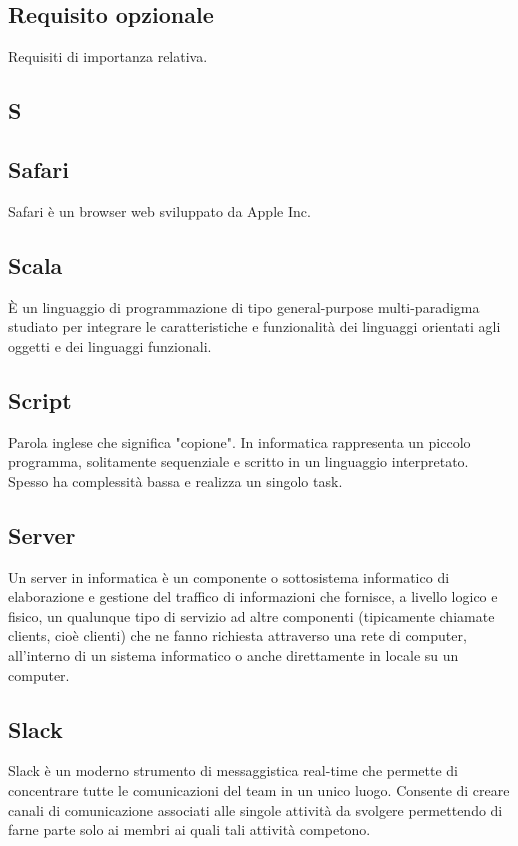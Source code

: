\subsection*{Requisito opzionale}
Requisiti di importanza relativa.

\newpage

\begin{center}
\Huge\section*{\uppercase{S}}
\end{center}

\subsection*{Safari}
Safari è un browser web sviluppato da Apple Inc. 

\subsection*{Scala}
È un linguaggio di programmazione di tipo general-purpose multi-paradigma studiato per integrare le caratteristiche e funzionalità dei linguaggi orientati agli oggetti e dei linguaggi funzionali.

\subsection*{Script}
Parola inglese che significa "copione". In informatica rappresenta un piccolo
programma, solitamente sequenziale e scritto in un linguaggio interpretato.
Spesso ha complessità bassa e realizza un singolo task.

\subsection*{Server}
Un server in informatica è un componente o sottosistema informatico di elaborazione e gestione del traffico di informazioni che fornisce, a livello logico e fisico, un qualunque tipo di servizio ad altre componenti (tipicamente chiamate clients, cioè clienti) che ne fanno richiesta attraverso una rete di computer, all'interno di un sistema informatico o anche direttamente in locale su un computer.

\subsection*{Slack}
Slack è un moderno strumento di messaggistica real-time che permette di concentrare tutte le comunicazioni del team in un unico luogo.
Consente di creare canali di comunicazione associati alle singole attività da svolgere permettendo di farne parte solo ai membri ai quali tali attività competono.

